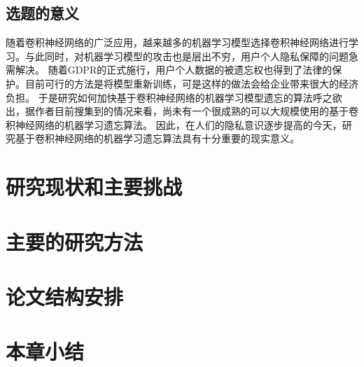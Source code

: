 \subsection{选题的意义}
随着卷积神经网络的广泛应用，越来越多的机器学习模型选择卷积神经网络进行学习。与此同时，对机器学习模型的攻击也是层出不穷，用户个人隐私保障的问题急需解决。
随着GDPR的正式施行，用户个人数据的被遗忘权也得到了法律的保护。目前可行的方法是将模型重新训练，可是这样的做法会给企业带来很大的经济负担。
于是研究如何加快基于卷积神经网络的机器学习模型遗忘的算法呼之欲出，据作者目前搜集到的情况来看，尚未有一个很成熟的可以大规模使用的基于卷积神经网络的机器学习遗忘算法。
因此，在人们的隐私意识逐步提高的今天，研究基于卷积神经网络的机器学习遗忘算法具有十分重要的现实意义。
\section{研究现状和主要挑战}

\section{主要的研究方法}

\section{论文结构安排}

\section{本章小结}

